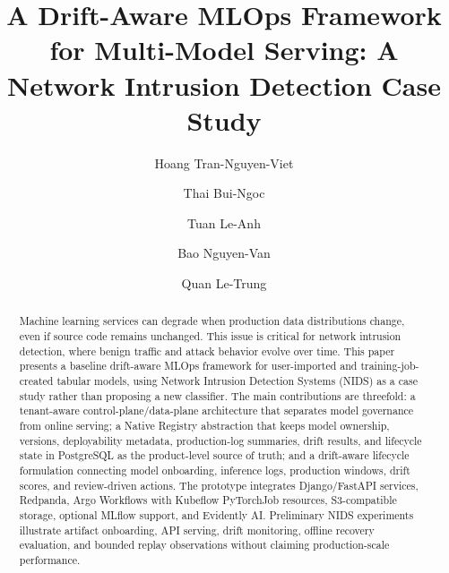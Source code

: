 \documentclass[runningheads]{llncs}
\begin{document}
\title{A Drift-Aware MLOps Framework for Multi-Model Serving: A Network Intrusion Detection Case Study}


\author{Hoang Tran-Nguyen-Viet \and
Thai Bui-Ngoc \and
Tuan Le-Anh \and
Bao Nguyen-Van \and
Quan Le-Trung
}



\maketitle

\begin{abstract}
Machine learning services can degrade when production data distributions change, even if source code remains unchanged. This issue is critical for network intrusion detection, where benign traffic and attack behavior evolve over time. This paper presents a baseline drift-aware MLOps framework for user-imported and training-job-created tabular models, using Network Intrusion Detection Systems (NIDS) as a case study rather than proposing a new classifier. The main contributions are threefold: a tenant-aware control-plane/data-plane architecture that separates model governance from online serving; a Native Registry abstraction that keeps model ownership, versions, deployability metadata, production-log summaries, drift results, and lifecycle state in PostgreSQL as the product-level source of truth; and a drift-aware lifecycle formulation connecting model onboarding, inference logs, production windows, drift scores, and review-driven actions. The prototype integrates Django/FastAPI services, Redpanda, Argo Workflows with Kubeflow PyTorchJob resources, S3-compatible storage, optional MLflow support, and Evidently AI. Preliminary NIDS experiments illustrate artifact onboarding, API serving, drift monitoring, offline recovery evaluation, and bounded replay observations without claiming production-scale performance.

\end{abstract}
\end{document}
